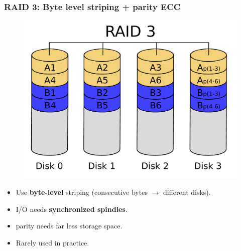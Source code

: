 \documentclass{beamer}
\begin{document}
\begin{frame}
    \frametitle{RAID 3: Byte level striping + parity ECC}
    \begin{figure}
    \includegraphics[height=0.3\paperwidth]{RAID3.pdf}
    \end{figure}
    \begin{itemize}
        \item Use \textbf{byte-level} striping (consecutive bytes $\rightarrow$ different disks). \pause
        \item I/O needs \textbf{synchronized spindles}. \pause
        \item parity needs far less storage space. \pause
        \item Rarely used in practice.
    \end{itemize}
\end{frame}
\end{document}
